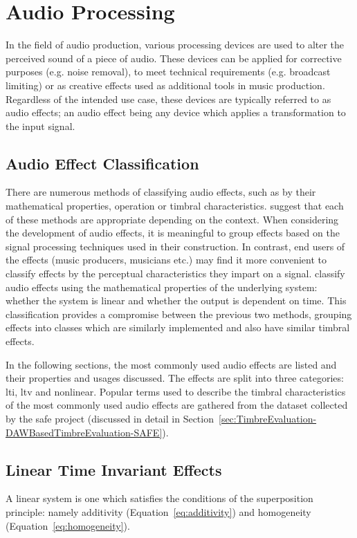 \section{Audio Processing}
\label{sec:Timbre-AudioProcessing}
	In the field of audio production, various processing devices are used to alter the perceived sound of a piece of
	audio. These devices can be applied for corrective purposes (e.g. noise removal), to meet technical requirements
	(e.g. broadcast limiting) or as creative effects used as additional tools in music production. Regardless of the
	intended use case, these devices are typically referred to as audio effects; an audio effect being any device which
	applies a transformation to the input signal.
	
	\subsection{Audio Effect Classification}
	\label{sec:Timbre-AudioProcessing-Classification}
		There are numerous methods of classifying audio effects, such as by their mathematical properties,
		operation or timbral characteristics. \citet{verfaille2006an} suggest that each of these methods are
		appropriate depending on the context. When considering the development of audio effects, it is meaningful
		to group effects based on the signal processing techniques used in their construction. In contrast, end
		users of the effects (music producers, musicians etc.) may find it more convenient to classify effects by
		the perceptual characteristics they impart on a signal. \citet{eichas2015feature} classify audio effects
		using the mathematical properties of the underlying system: whether the system is linear and whether the
		output is dependent on time. This classification provides a compromise between the previous two methods,
		grouping effects into classes which are similarly implemented and also have similar timbral effects.
		
		In the following sections, the most commonly used audio effects are listed and their properties and usages
		discussed. The effects are split into three categories: \acrfull{lti}, \acrfull{ltv} and nonlinear. Popular
		terms used to describe the timbral characteristics of the most commonly used audio effects are gathered
		from the dataset collected by the \acrshort{safe} project (discussed in detail in
		Section~\ref{sec:TimbreEvaluation-DAWBasedTimbreEvaluation-SAFE}).

	\subsection{Linear Time Invariant Effects}
	\label{sec:Timbre-AudioProcessing-LTI}
		A linear system is one which satisfies the conditions of the superposition principle: namely additivity
		(Equation~\ref{eq:additivity}) and homogeneity (Equation~\ref{eq:homogeneity}).

